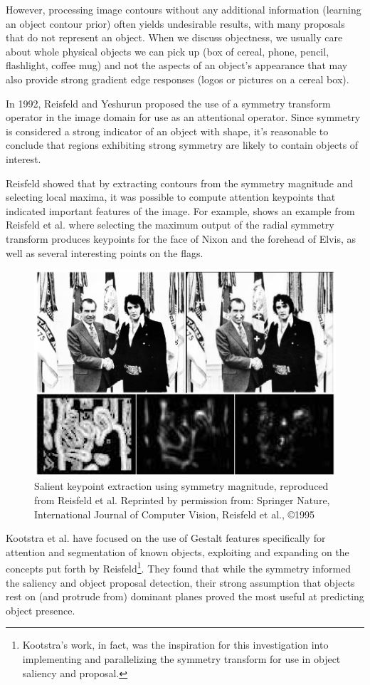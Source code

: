 However, processing image contours without any additional information (\eg learning an object contour prior) often yields undesirable results, with many proposals that do not represent an object. When we discuss objectness, we usually care about whole physical objects we can pick up (box of cereal, phone, pencil, flashlight, coffee mug) and not the aspects of an object's appearance that may also provide strong gradient edge responses (\eg logos or pictures on a cereal box).

In 1992, Reisfeld and Yeshurun proposed the use of a symmetry transform operator\cite{reisfeld_robust_1992} in the image domain for use as an attentional operator. Since symmetry is considered a strong indicator of an object with shape\cite{dickinson_symmetry_2013}, it's reasonable to conclude that regions exhibiting strong symmetry are likely to contain objects of interest.

Reisfeld showed that by extracting contours from the symmetry magnitude and selecting local maxima, it was possible to compute attention keypoints that indicated important features of the image. For example,  shows an example from Reisfeld et al. \cite{reisfeld_context_1995} where selecting the maximum output of the radial symmetry transform produces keypoints for the face of Nixon and the forehead of Elvis, as well as several interesting points on the flags.

\begin{figure}[htbp]
\centering
\includegraphics[width=0.7\linewidth]{Introduction/elvis.png}
\caption{\label{fig:salient}
Salient keypoint extraction using symmetry magnitude, reproduced from Reisfeld et al.\cite{reisfeld_context_1995} Reprinted by permission from: Springer Nature, International Journal of Computer Vision, Reisfeld et al., \copyright 1995}
\end{figure}

Kootstra et al. have focused on the use of Gestalt features specifically for attention and segmentation of known objects\cite{kootstra_using_2010,kootstra_gestalt_2011}, exploiting and expanding on the concepts put forth by Reisfeld\footnote{Kootstra's work, in fact, was the inspiration for this investigation into implementing and parallelizing the symmetry transform for use in object saliency and proposal.}. They found that while the symmetry informed the saliency and object proposal detection, their strong assumption that objects rest on (and protrude from) dominant planes proved the most useful at predicting object presence. 

